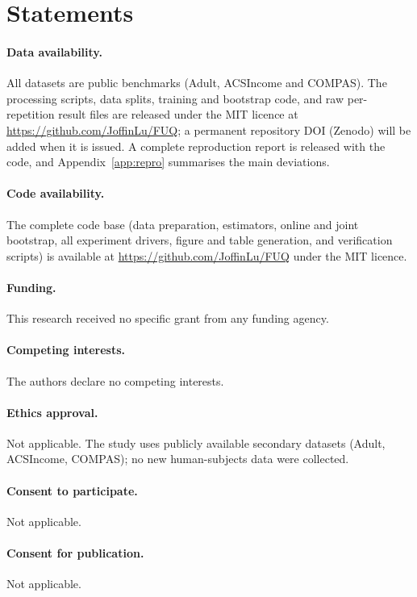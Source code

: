 \documentclass[11pt]{article}
\begin{document}
\section*{Statements}

\paragraph{Data availability.} All datasets are public benchmarks (Adult, ACSIncome and COMPAS).
The processing scripts, data splits, training and bootstrap code, and raw per-repetition result
files are released under the MIT licence at \url{https://github.com/JoffinLu/FUQ}; a permanent
repository DOI (Zenodo) will be added when it is issued.  A complete reproduction report is
released with the code, and Appendix~\ref{app:repro} summarises the main deviations.

\paragraph{Code availability.} The complete code base (data preparation, estimators, online and
joint bootstrap, all experiment drivers, figure and table generation, and verification scripts)
is available at \url{https://github.com/JoffinLu/FUQ} under the MIT licence.

\paragraph{Funding.} This research received no specific grant from any funding agency.

\paragraph{Competing interests.} The authors declare no competing interests.

\paragraph{Ethics approval.} Not applicable. The study uses publicly available secondary datasets
(Adult, ACSIncome, COMPAS); no new human-subjects data were collected.

\paragraph{Consent to participate.} Not applicable.

\paragraph{Consent for publication.} Not applicable.
\end{document}
